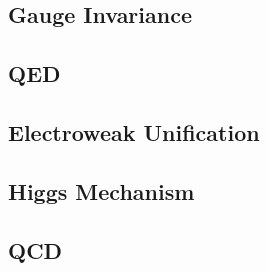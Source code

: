 \subsection{Gauge Invariance}

\subsection{QED}

\subsection{Electroweak Unification}

\subsection{Higgs Mechanism}

\subsection{QCD}


